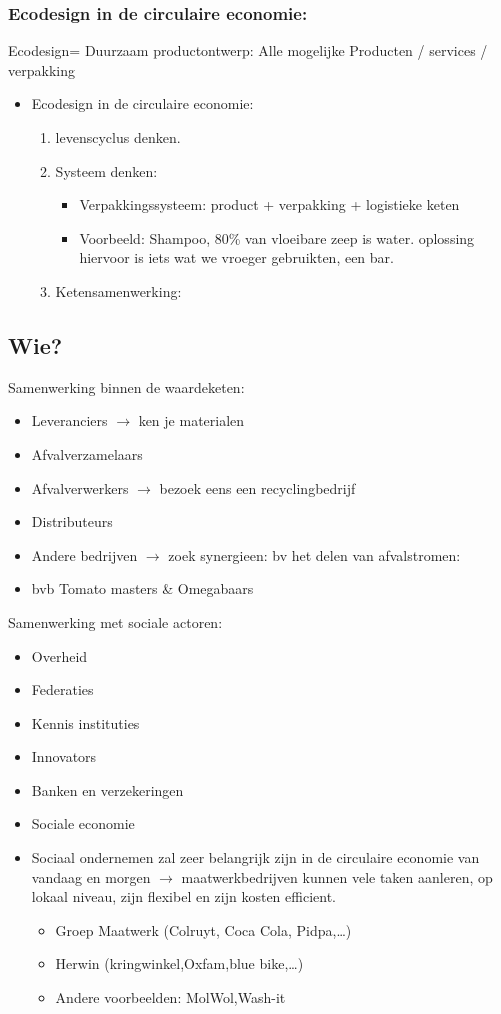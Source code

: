 \documentclass[12pt]{article}
\begin{document}
\subsubsection{Ecodesign in de circulaire economie:}
Ecodesign= Duurzaam productontwerp: Alle mogelijke Producten / services / verpakking\begin{itemize}
    \item Ecodesign in de circulaire economie:\begin{enumerate}
        \item levenscyclus denken.
        \item Systeem denken:\begin{itemize}
            \item Verpakkingssysteem: product + verpakking + logistieke keten 
            \item Voorbeeld: Shampoo, 80\% van vloeibare zeep is water. oplossing hiervoor is iets wat we vroeger gebruikten, een bar.
        \end{itemize}
        \item Ketensamenwerking:
    \end{enumerate} 
\end{itemize}
\subsection{Wie?}
Samenwerking binnen de waardeketen:\begin{itemize}
    \item Leveranciers $\rightarrow$ ken je materialen 
    \item Afvalverzamelaars 
    \item Afvalverwerkers $\rightarrow$ bezoek eens een recyclingbedrijf 
    \item Distributeurs 
    \item Andere bedrijven $\rightarrow$ zoek synergieen: bv het delen van afvalstromen:
    \item bvb Tomato masters \& Omegabaars 
\end{itemize}
Samenwerking met sociale actoren:\begin{itemize}
    \item Overheid
    \item Federaties
    \item Kennis instituties 
    \item Innovators 
    \item Banken en verzekeringen 
    \item Sociale economie
    \item Sociaal ondernemen zal zeer belangrijk zijn in de circulaire economie van vandaag en morgen $\rightarrow$ maatwerkbedrijven kunnen vele taken aanleren, op lokaal niveau, zijn flexibel en zijn kosten efficient.\begin{itemize}
        \item Groep Maatwerk  (Colruyt, Coca Cola, Pidpa,\dots)
        \item Herwin (kringwinkel,Oxfam,blue bike,\dots)
        \item Andere voorbeelden: MolWol,Wash-it
    \end{itemize}
\end{itemize}
\end{document}
